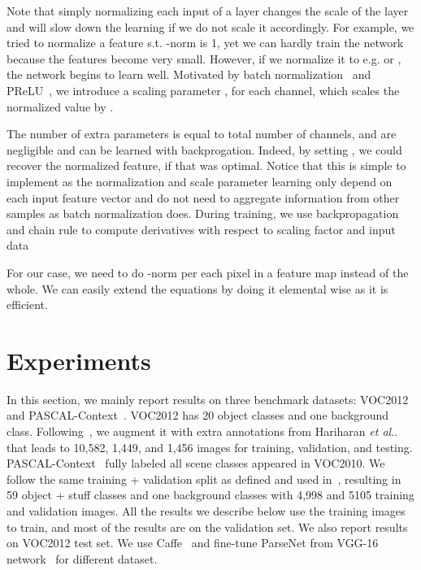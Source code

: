 \documentclass{article} \usepackage{iclr2016_conference}
\makeatletter
\DeclareRobustCommand\onedot{\futurelet\@let@token\@onedot}
\def\@onedot{\ifx\@let@token.\else.\null\fi\xspace}
\def\etal{\emph{et al}\onedot}
\makeatother
\begin{document}
Note that simply normalizing each input of a layer changes the scale of the layer and will slow down the learning if we do not scale it accordingly. For example, we tried to normalize a feature s.t. -norm is 1, yet we can hardly train the network because the features become very small. However, if we normalize it to e.g.  or , the network begins to learn well. Motivated by batch normalization~\cite{ioffe2015batch} and PReLU~\cite{he2015delving}, we introduce a scaling parameter , for each channel, which scales the normalized value by .

The number of extra parameters is equal to total number of channels, and are negligible and can be learned with backprogation. Indeed, by setting , we could recover the  normalized feature, if that was optimal. Notice that this is simple to implement as the normalization and scale parameter learning only depend on each input feature vector and do not need to aggregate information from other samples as batch normalization does. During training, we use backpropagation and chain rule to compute derivatives with respect to scaling factor  and input data 

For our case, we need to do -norm per each pixel in a feature map instead of the whole. We can easily extend the equations by doing it elemental wise as it is efficient.

\section{Experiments}
\label{sec:experiment}
In this section, we mainly report results on three benchmark datasets: VOC2012~\cite{everingham2014pascal} and PASCAL-Context~\cite{mottaghi2014role}. VOC2012 has 20 object classes and one background class. Following~\cite{long2014fully, chen2014semantic}, we augment it with extra annotations from Hariharan \etal~\cite{hariharan2011semantic} that leads to 10,582, 1,449, and 1,456 images for training, validation, and testing. PASCAL-Context~\cite{mottaghi2014role} fully labeled all scene classes appeared in VOC2010. We follow the same training + validation split as defined and used in~\cite{mottaghi2014role, long2014fully}, resulting in 59 object + stuff classes and one background classes with 4,998 and 5105 training and validation images. All the results we describe below use the training images to train, and most of the results are on the validation set. We also report results on VOC2012 test set. We use Caffe~\cite{jia2013caffe} and fine-tune ParseNet from VGG-16 network~\cite{simonyan2014very} for different dataset.
\end{document}

